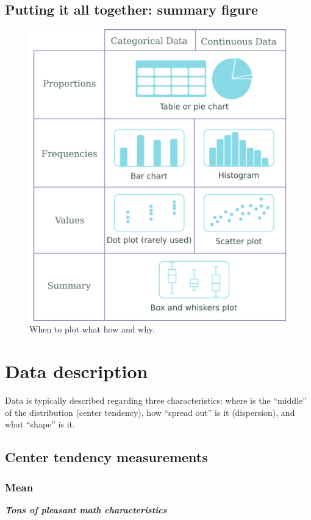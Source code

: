 \documentclass{report}
\newcommand{\notefor}[1]{\hfill\textbf{\textit{#1}}}
\begin{document}
	\section{Putting it all together: summary figure}
	\begin{figure}[H]
		\centering
		\includegraphics[width=1.0\textwidth]{data_presentation.png}
		\caption{When to plot what how and why.}
		\label{fig:summary}
	\end{figure}
	
\chapter{Data description}
Data is typically described regarding three characteristics: where is the ``middle'' of the distribution (center tendency), how ``spread out'' is it (dispersion), and what ``shape'' is it.

	\section{Center tendency measurements}
		\subsection{Mean}
		\notefor{Tons of pleasant math characteristics}
		
\end{document}
